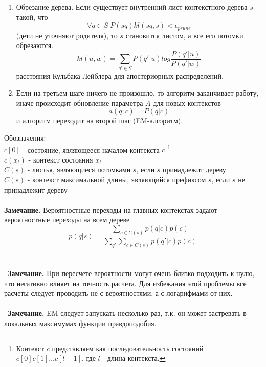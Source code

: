 \documentclass{matmex-diploma-custom}
\begin{document}
\begin{enumerate}
\begin{enumerate}
Пересчет $ B $ зависит от принятого семейства моделей испусканий и производится с помощью $ \gamma $ в точности также как и в алгоритме Баума-Велша.
В случае распределения Пуассона
$b(.~|~c) \~ Poisson(\lambda_{c})$ 
пересчет параметров происходит следующим образом
$$ \lambda_{c} = \frac{\sum_{t}{\gamma_{t}(c)y_{t}}}{\sum_{t}{\gamma_{t}(c)}}$$
\end{enumerate}
EM-алгоритм запускает поочередно E-шаг и M-шаг, пока правдоподобие с предыдущей итерации отстает от правдоподобия с текущей итерации более, чем на $ \epsilon_{EM}$
(т.е. пока итерация дает значимый прирост правдоподобия)
\item Обрезание дерева.
Если существует внутренний лист контекстного дерева $ s $ такой, что 
$$ \forall q \in S \; P(sq)kl(sq, s) < \epsilon_{prune} $$
(дети не уточняют родителя), то $ s $ становится листом, а все его потомки обрезаются.
$$kl(u, w) = \sum_{q' \in S} P(q'|u) log\frac{P(q'|u)}{P(q'|w)}$$
расстояния Кульбака-Лейблера для апостериорных распределений.
\item Если на третьем шаге ничего не произошло, то алгоритм заканчивает работу, 
иначе происходит обновление параметра $ A $ для новых контекстов
$$ a(q; c) = P(q| c) $$
и алгоритм переходит на второй шаг (EM-алгоритм).

\end{enumerate}
Обозначения: 
\\
$ c[0] $ - состояние, являющееся началом контекста $ c $
\footnote{Контекст $ c $ представляем как последовательность состояний 
$c[0]c[1]\ldots c[l-1]$, где $ l $ - длина контекста.}
\\
$ c(x_{t}) $ - контекст состояния $ x_{t} $ 
\\
$ C(s) $ - листья, являющиеся потомками $ s $, если $ s $ принадлежит дереву 
\\
$ C(s) $ - контекст максимальной длины, являющийся префиксом $ s $, если $ s $ не принадлежит дереву 
\\\\
\textbf{Замечание.}  Вероятностные переходы на главных контекстах задают вероятностные переходы на всем дереве
$$ p(q|s) = \frac{\sum_{c \in C(s)} {p(q|c)p(c)}}{\sum_{q'}\sum_{c \in C(s)} {p(q'|c)p(c)}} $$ 
\\\\\
\textbf{Замечание.} При пересчете вероятности могут очень близко подходить к нулю, что негативно влияет на точность расчета. Для избежания этой проблемы все расчеты следует проводить не с вероятностями, а с логарифмами от них.
\\\\\
\textbf{Замечание.} EM следует запускать несколько раз, т.к. он может застревать в локальных максимумах функции правдоподобия.
\end{document}
